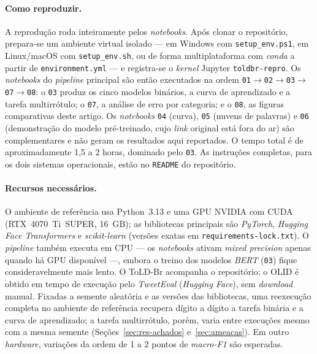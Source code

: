 \documentclass[sigconf, nonacm]{acmart}
\begin{document}
\paragraph{Como reproduzir.} A reprodução roda inteiramente pelos \emph{notebooks}. Após
clonar o repositório, prepara-se um ambiente virtual isolado --- em Windows com
\texttt{setup\_env.ps1}, em Linux/macOS com \texttt{setup\_env.sh}, ou de forma
multiplataforma com \emph{conda} a partir de \texttt{environment.yml} --- e registra-se o
\emph{kernel} Jupyter \texttt{toldbr-repro}. Os \emph{notebooks} do \emph{pipeline}
principal são então executados na ordem
\texttt{01}$\rightarrow$\texttt{02}$\rightarrow$\texttt{03}$\rightarrow$\texttt{07}$\rightarrow$\texttt{08}:
o \texttt{03} produz os cinco modelos binários, a curva de aprendizado e a tarefa
multirrótulo; o \texttt{07}, a análise de erro por categoria; e o \texttt{08}, as figuras
comparativas deste artigo. Os \emph{notebooks} \texttt{04} (curva), \texttt{05} (nuvens de
palavras) e \texttt{06} (demonstração do modelo pré-treinado, cujo \emph{link} original está
fora do ar) são complementares e não geram os resultados aqui reportados. O tempo total é de
aproximadamente 1,5 a 2 horas, dominado pelo \texttt{03}. As instruções completas, para os
dois sistemas operacionais, estão no \texttt{README} do repositório.

\paragraph{Recursos necessários.} O ambiente de referência usa Python~3.13 e uma GPU NVIDIA
com CUDA (RTX~4070~Ti~SUPER, 16~GB); as bibliotecas principais são \emph{PyTorch}, \emph{Hugging
Face Transformers} e \emph{scikit-learn} (versões exatas em
\texttt{requirements\allowbreak-lock.txt}). O \emph{pipeline} também executa em CPU --- os
\emph{notebooks} ativam \emph{mixed precision} apenas quando há GPU disponível ---, embora o
treino dos modelos \emph{BERT} (\texttt{03}) fique consideravelmente mais lento. O ToLD-Br
acompanha o repositório; o OLID é obtido em tempo de execução pelo \emph{TweetEval}
(\emph{Hugging Face}), sem \emph{download} manual. Fixadas a semente aleatória e as versões das
bibliotecas, uma reexecução completa no ambiente de referência recupera dígito a dígito a tarefa
binária e a curva de aprendizado; a tarefa multirrótulo, porém, varia entre execuções mesmo com
a mesma semente (Seções~\ref{sec:res-achados} e~\ref{sec:ameacas}). Em outro \emph{hardware},
variações da ordem de 1 a 2 pontos de \emph{macro-F1} são esperadas.
\end{document}
